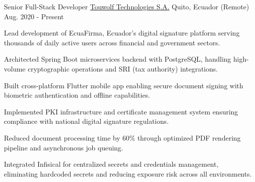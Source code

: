 
\begin{cventries}

  \cventry
    {Senior Full-Stack Developer} %
    {\href{https://touwolf.com/}{Touwolf Technologies S.A.}} %
    {Quito, Ecuador (Remote)} %
    {Aug. 2020 - Present} %
    {
      \begin{cvitems} %
        \item {Lead development of EcuaFirma, Ecuador's digital signature platform serving thousands of daily active users across financial and government sectors.}
        \item {Architected Spring Boot microservices backend with PostgreSQL, handling high-volume cryptographic operations and SRI (tax authority) integrations.}
        \item {Built cross-platform Flutter mobile app enabling secure document signing with biometric authentication and offline capabilities.}
        \item {Implemented PKI infrastructure and certificate management system ensuring compliance with national digital signature regulations.}
        \item {Reduced document processing time by 60\% through optimized PDF rendering pipeline and asynchronous job queuing.}
        \item {Integrated Infisical for centralized secrets and credentials management, eliminating hardcoded secrets and reducing exposure risk across all environments.}
      \end{cvitems}
    }


\end{cventries}
